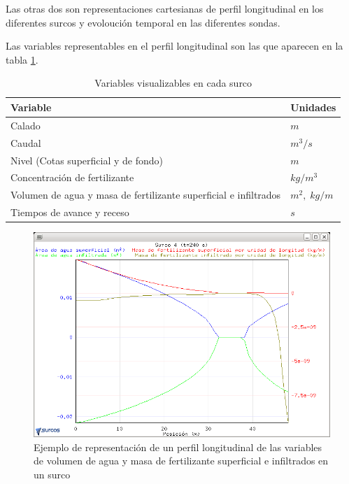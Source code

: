 Las otras dos son representaciones cartesianas de perfil longitudinal en los diferentes surcos y evoloución temporal en las diferentes sondas.

Las variables representables en el perfil longitudinal son las que aparecen en la tabla \ref{tableVariables2}.

\begin{table}[h]\footnotesize
\begin{center}
\begin{tabular}{ll}
\hline
Variable & Unidades\\
\hline
Calado & $m$ \\
Caudal & $ m^3/s $\\
Nivel (Cotas superficial y de fondo) & $ m $\\
Concentración de fertilizante & $ kg/m^3 $\\
Volumen de agua y masa de fertilizante superficial e infiltrados & $ m^2,\;kg/m $ \\
Tiempos de avance y receso & $ s $ \\
\hline
\end{tabular}
\end{center}
  \caption{Variables visualizables en cada surco}\label{tableVariables2}
\end{table}

\begin{figure}[!h]
\begin{center}
\includegraphics*[width=\textwidth]{images/evoSurco.png}
\qquad
\caption{Ejemplo de representación de un perfil longitudinal de las variables de volumen de agua y masa de fertilizante superficial e infiltrados en un surco}\label{evo2}
\end{center}
\end{figure}

